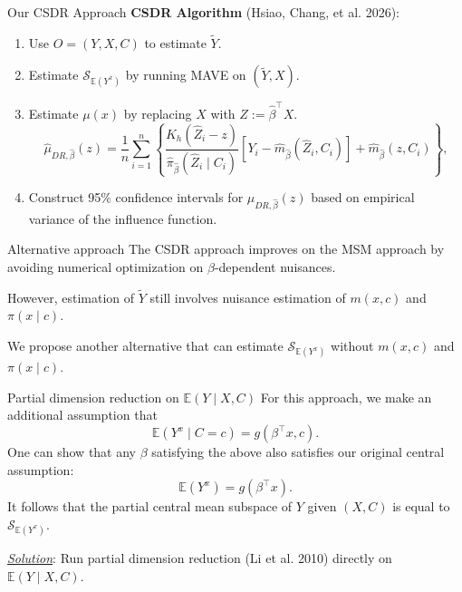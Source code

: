 \documentclass[
  ignorenonframetext,
  aspectratio=169,
  11pt]{beamer}
\providecommand{\tightlist}{%
  \setlength{\itemsep}{0pt}\setlength{\parskip}{0pt}}
\begin{document}
\begin{frame}{Our CSDR Approach}
\protect{}\label{our-csdr-approach}
\textbf{CSDR Algorithm} {\color{emoryblue}(Hsiao, Chang, et al. 2026)}:

\begin{enumerate}
\tightlist
\item
  Use \(O=(Y,X,C)\) to estimate \(\widetilde{Y}\).
\item
  Estimate \(\mathcal{S}_{\mathbb{E}(Y^x)}\) by running MAVE on
  \((\widetilde{Y}, X)\).
\item
  Estimate \(\mu(x)\) by replacing \(X\) with \(Z:=\hat{\beta}^\top X\).
  \[
  \widehat{\mu}_{DR,\widehat{\beta}}(z)
  =
  \frac{1}{n}\sum_{i=1}^n
  \left\{
  \frac{K_h(\widehat Z_i-z)}
  {\widehat{\pi}_{\widehat{\beta}}(\widehat Z_i\mid C_i)}
  \left[Y_i-\widehat m_{\widehat{\beta}}(\widehat Z_i,C_i)\right]
  +\widehat m_{\widehat{\beta}}(z,C_i)
  \right\},
  \]
\item
  Construct 95\% confidence intervals for
  \(\hat{\mu}_{DR, \hat{\beta}}(z)\) based on empirical variance of the
  influence function.
\end{enumerate}
\end{frame}

\begin{frame}{Alternative approach}
\protect{}\label{alternative-approach}
The CSDR approach improves on the MSM approach by avoiding numerical
optimization on \(\beta\)-dependent nuisances.

\vspace{0.4cm}

However, estimation of \(\widetilde{Y}\) still involves nuisance
estimation of \(m(x,c)\) and \(\pi(x\mid c)\).

\vspace{0.4cm}

We propose another alternative that can estimate
\(\mathcal{S}_{\mathbb{E}(Y^x)}\) without \(m(x,c)\) and
\(\pi(x\mid c)\).
\end{frame}

\begin{frame}{Partial dimension reduction on \(\mathbb{E}(Y\mid X,C)\)}
\protect{}\label{partial-dimension-reduction-on-mathbbeymid-xc}
For this approach, we make an additional assumption that \[
\mathbb{E}(Y^x \mid C=c) = g(\beta^\top x, c).
\] One can show that any \(\beta\) satisfying the above also satisfies
our original central assumption: \[
\mathbb{E}(Y^x) = g(\beta^\top x).
\] It follows that the partial central mean subspace of \(Y\) given
\((X, C)\) is equal to \(\mathcal{S}_{\mathbb{E}(Y^x)}\).

\pause

\vspace{0.34cm}

\underline{\textit{Solution}}: Run partial dimension reduction
{\color{emoryblue}(Li et al. 2010)} directly on
\(\mathbb{E}(Y\mid X,C)\).
\end{frame}
\end{document}
